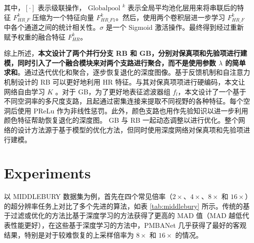 \documentclass[14px]{article}
\begin{document}
其中，$[\cdot]$ 表示级联操作，$\text { Globalpool }^{k}$ 表示全局平均池化层用来将串联后的特征 $F_{HR\_F}^k$ 压缩为一个特征向量 $F_{HR\_F1}^k$。然后，使用两个卷积层进一步学习 $F_{HR\_F}^k$ 中各个通道之间的统计相关性。$\sigma$ 是一个 Sigmoid 激活操作。最终得到经过重新赋予权重的融合特征 $F_{HR}^k$。


综上所述，\textbf{本文设计了两个并行分支 RB 和 GB，分别对保真项和先验项进行建模，同时引入了一个融合模块来对两个支路进行聚合，而不是使用参数 $\lambda$ 的简单求和}。通过迭代优化和聚合，逐步恢复退化的深度图像。基于反馈机制和自注意力机制设计的 RB 可以更好地利用 HR 特征。与其对保真项项进行硬编码，本文让网络自由学习 $K$ 。对于 GB，为了更好地表征滤波器组 $f_l$，本文设计了一个基于不同空洞率的多尺度支路，且起通过密集连接来提取不同视野的各种特征。每个空洞后使用 PReLu 作为非线性惩罚。此外，颜色支路也用作先验知识以进一步利用颜色特征帮助恢复退化的深度图。 GB 与 RB 一起动态调整以进行优化。整个网络的设计方法源于基于模型的优化方法，但同时使用深度网络对保真项和先验项进行建模。

\section{Experiments}
\label{experimentes}

以 MIDDLEBURY 数据集为例，首先在四个常见倍率（$2\times$、$4\times$、$8\times$ 和 $16\times$）的超分辨率任务上对比了多个先进的算法，如表 \ref{tab:middlebury} 所示。传统的基于过滤或优化的方法比基于深度学习的方法获得了更高的 MAD 值（MAD 越低代表性能更好），在这些基于深度学习的方法中，PMBANet 几乎获得了最好的客观结果，特别是对于较难恢复的上采样倍率为 $8\times$ 和 $16\times$ 的情况。
\end{document}
